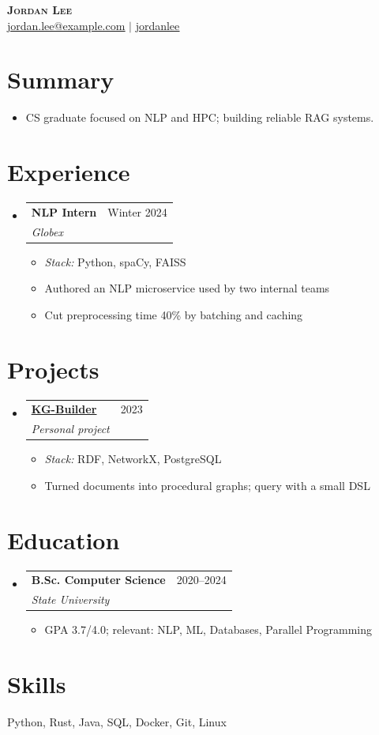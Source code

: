 \documentclass[letterpaper,11pt]{article}
\makeatletter
\newcommand{\resumeItem}[1]{
  \item\small{
    {#1 \vspace{-2pt}}
  }
}
\newcommand{\resumeSubheading}[4]{
  \vspace{-2pt}\item
    \begin{tabular*}{0.97\linewidth}[t]{l@{\extracolsep{\fill}}r}
      \textbf{#1} & #2 \\
      \textit{\small#3} & \textit{\small #4} \\
    \end{tabular*}\vspace{-7pt}
}
\newcommand{\resumeSubHeadingListStart}{\begin{itemize}[leftmargin=0.15in, label={}]}
\newcommand{\resumeSubHeadingListEnd}{\end{itemize}}
\newcommand{\resumeItemListStart}{\begin{itemize}}
\newcommand{\resumeItemListEnd}{\end{itemize}\vspace{-5pt}}
\makeatother
\begin{document}
\begin{center}
    \textbf{\Huge \scshape Jordan Lee} \\ \vspace{1pt}
    \small \href{mailto:jordan.lee@example.com}{\underline{jordan.lee@example.com}} $|$ \href{https://github.com/jordanlee}{\underline{jordanlee}}
\end{center}

\section{Summary}
\resumeItemListStart
  \resumeItem{CS graduate focused on NLP and HPC; building reliable RAG systems.}
\resumeItemListEnd

\section{Experience}
  \resumeSubHeadingListStart
    \resumeSubheading
      {NLP Intern}{Winter 2024}
      {Globex}{}
      \resumeItemListStart
        \resumeItem{\textit{Stack:} Python, spaCy, FAISS}
        \resumeItem{Authored an NLP microservice used by two internal teams}
        \resumeItem{Cut preprocessing time 40\% by batching and caching}
      \resumeItemListEnd
  \resumeSubHeadingListEnd

\section{Projects}
  \resumeSubHeadingListStart
    \resumeSubheading
      {\href{https://github.com/jordanlee/kg-builder}{\underline{KG-Builder}}}{2023}
      {Personal project}{}
      \resumeItemListStart
        \resumeItem{\textit{Stack:} RDF, NetworkX, PostgreSQL}
        \resumeItem{Turned documents into procedural graphs; query with a small DSL}
      \resumeItemListEnd
  \resumeSubHeadingListEnd

\section{Education}
  \resumeSubHeadingListStart
    \resumeSubheading
      {B.Sc. Computer Science}{2020–2024}
      {State University}{}
      \resumeItemListStart
        \resumeItem{GPA 3.7/4.0; relevant: NLP, ML, Databases, Parallel Programming}
      \resumeItemListEnd
  \resumeSubHeadingListEnd

\section{Skills}
  \begin{itemize}[leftmargin=0.15in, label={}]
    \small{\item{Python, Rust, Java, SQL, Docker, Git, Linux}}
  \end{itemize}
\end{document}
